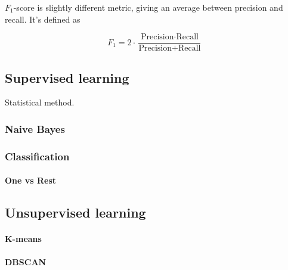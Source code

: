 $F_1$-score is slightly different metric, giving an average between precision and recall. It's defined as

\begin{equation}
    F_1 = 2 \cdot \dfrac{\text{Precision} \cdot \text{Recall}}{\text{Precision} + \text{Recall}}
\end{equation}

\newpage

\subsection{Supervised learning}

Statistical method.

\subsubsection{Naive Bayes}

\subsubsection{Classification}

\paragraph{One vs Rest}



\subsection{Unsupervised learning}

\paragraph{K-means}

\paragraph{DBSCAN}

